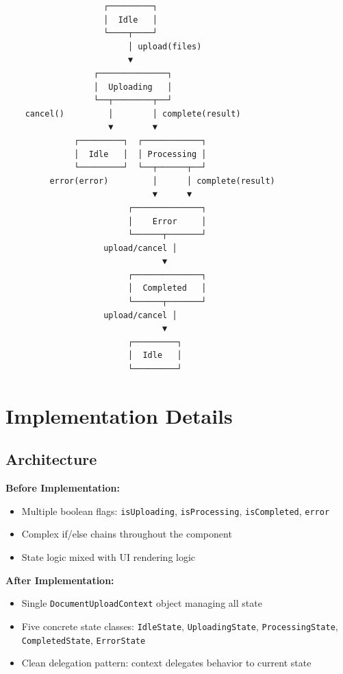 \documentclass[11pt,a4paper]{article}
\begin{document}
\begin{verbatim}
                    ┌─────────┐
                    │  Idle   │
                    └────┬────┘
                         │ upload(files)
                         ▼
                  ┌──────────────┐
                  │  Uploading   │
                  └──┬────────┬──┘
    cancel()         │        │ complete(result)
                     ▼        ▼
              ┌─────────┐  ┌────────────┐
              │  Idle   │  │ Processing │
              └─────────┘  └──┬──────┬──┘
         error(error)         │      │ complete(result)
                              ▼      ▼
                         ┌──────────────┐
                         │    Error     │
                         └──────┬───────┘
                    upload/cancel │
                                ▼
                         ┌──────────────┐
                         │  Completed   │
                         └──────┬───────┘
                    upload/cancel │
                                ▼
                         ┌─────────┐
                         │  Idle   │
                         └─────────┘
\end{verbatim}

\section{Implementation Details}

\subsection{Architecture}

\textbf{Before Implementation:}
\begin{itemize}
    \item Multiple boolean flags: \texttt{isUploading}, \texttt{isProcessing}, \texttt{isCompleted}, \texttt{error}
    \item Complex if/else chains throughout the component
    \item State logic mixed with UI rendering logic
\end{itemize}

\textbf{After Implementation:}
\begin{itemize}
    \item Single \texttt{DocumentUploadContext} object managing all state
    \item Five concrete state classes: \texttt{IdleState}, \texttt{UploadingState}, \texttt{ProcessingState}, \texttt{CompletedState}, \texttt{ErrorState}
    \item Clean delegation pattern: context delegates behavior to current state
\end{itemize}
\end{document}
